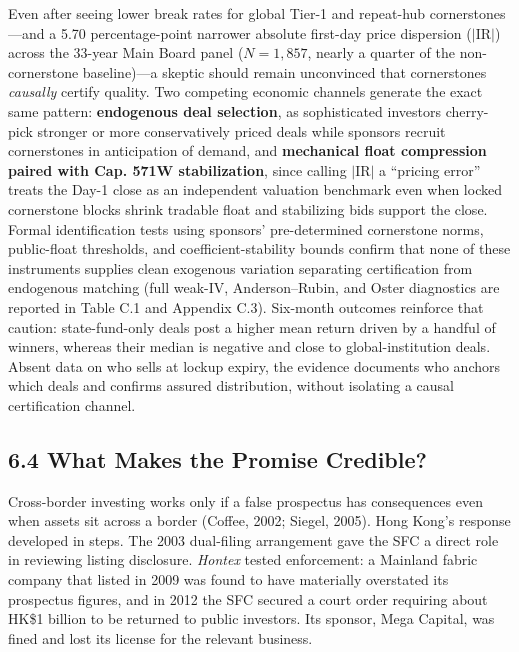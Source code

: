 \documentclass[11pt,letterpaper]{article}
\begin{document}
\begin{table}[!htbp]
\end{table}

Even after seeing lower break rates for global Tier-1 and repeat-hub cornerstones—and a 5.70 percentage-point narrower absolute first-day price dispersion ($|\text{IR}|$) across the 33-year Main Board panel ($N = 1,857$, nearly a quarter of the non-cornerstone baseline)—a skeptic should remain unconvinced that cornerstones \textit{causally} certify quality. Two competing economic channels generate the exact same pattern: \textbf{endogenous deal selection}, as sophisticated investors cherry-pick stronger or more conservatively priced deals while sponsors recruit cornerstones in anticipation of demand, and \textbf{mechanical float compression paired with Cap. 571W stabilization}, since calling $|\text{IR}|$ a ``pricing error'' treats the Day-1 close as an independent valuation benchmark even when locked cornerstone blocks shrink tradable float and stabilizing bids support the close. Formal identification tests using sponsors' pre-determined cornerstone norms, public-float thresholds, and coefficient-stability bounds confirm that none of these instruments supplies clean exogenous variation separating certification from endogenous matching (full weak-IV, Anderson–Rubin, and Oster diagnostics are reported in Table C.1 and Appendix C.3). Six-month outcomes reinforce that caution: state-fund-only deals post a higher mean return driven by a handful of winners, whereas their median is negative and close to global-institution deals. Absent data on who sells at lockup expiry, the evidence documents who anchors which deals and confirms assured distribution, without isolating a causal certification channel.

\subsection*{\texorpdfstring{6.4 What Makes the Promise Credible?}{6.4 What Makes the Promise Credible?}}
Cross-border investing works only if a false prospectus has consequences even when assets sit across a border (Coffee, 2002; Siegel, 2005). Hong Kong's response developed in steps. The 2003 dual-filing arrangement gave the SFC a direct role in reviewing listing disclosure. \textit{Hontex} tested enforcement: a Mainland fabric company that listed in 2009 was found to have materially overstated its prospectus figures, and in 2012 the SFC secured a court order requiring about HK\$1 billion to be returned to public investors. Its sponsor, Mega Capital, was fined and lost its license for the relevant business.
\end{document}
